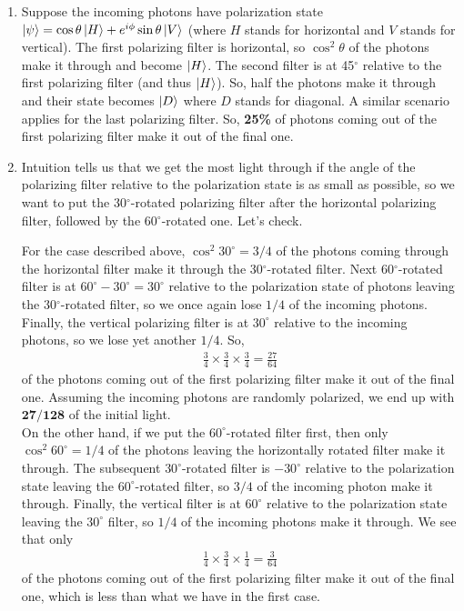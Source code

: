 \documentclass{article}
\theoremstyle{definition}
\newcommand{\f}[2]{\frac{#1}{#2}}
\begin{document}
\begin{enumerate}[label=(\alph*)]
	\item Suppose the incoming photons have polarization state $\ket{\psi} = \cos\theta \ket{H} + e^{i\phi}\sin\theta \ket{V}$ (where $H$ stands for horizontal and $V$ stands for vertical). The first polarizing filter is horizontal, so $\cos^2\theta$ of the photons make it through and become $\ket{H}$. The second filter is at 45$^\circ$ relative to the first polarizing filter (and thus $\ket{H}$). So, half the photons make it through and their state becomes $\ket{D}$ where $D$ stands for diagonal. A similar scenario applies for the last polarizing filter. So, \textbf{25\%} of photons coming out of the first polarizing filter make it out of the final one. 
	
	\item Intuition tells us that we get the most light through if the angle of the polarizing filter relative to the polarization state is as small as possible, so we want to put the 30$^\circ$-rotated polarizing filter after the horizontal polarizing filter, followed by the 60$^\circ$-rotated one. Let's check. 
	
	For the case described above, $\cos^2 30^\circ = 3/4$ of the photons coming through the horizontal filter make it through the 30$^\circ$-rotated filter. Next 60$^\circ$-rotated filter is at $60^\circ - 30^\circ = 30^\circ$ relative to the polarization state of photons leaving the 30$^\circ$-rotated filter, so we once again lose $1/4$ of the incoming photons. Finally, the vertical polarizing filter is at $30^\circ$ relative to the incoming photons, so we lose yet another $1/4$. So, 
	\begin{align*}
		\f{3}{4} \times \f{3}{4} \times \frac{3}{4} = \f{27}{64}
	\end{align*}
	of the photons coming out of the first polarizing filter make it out of the final one. Assuming the incoming photons are randomly polarized, we end up with $\textbf{27/128}$ of the initial light. \\
	
	
	On the other hand, if we put the $60^\circ$-rotated filter first, then only $\cos^2 60^\circ = 1/4$ of the photons leaving the horizontally rotated filter make it through. The subsequent $30^\circ$-rotated filter is $-30^\circ$ relative to the polarization state leaving the $60^\circ$-rotated filter, so $3/4$ of the incoming photon make it through. Finally, the vertical filter is at $60^\circ$ relative to the polarization state leaving the $30^\circ$ filter, so $1/4$ of the incoming photons make it through. We see that only 
	\begin{align*}
		\f{1}{4}\times \f{3}{4} \times \f{1}{4} = \f{3}{64}
	\end{align*}
	of the photons coming out of the first polarizing filter make it out of the final one, which is less than what we have in the first case.   
\end{enumerate}
\end{document}
